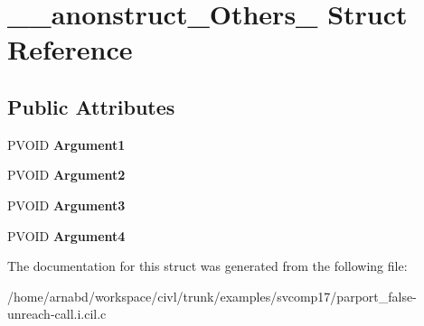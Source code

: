 \hypertarget{struct____anonstruct__Others__84}{}\section{\+\_\+\+\_\+anonstruct\+\_\+\+Others\+\_ Struct Reference}
\label{struct____anonstruct__Others__84}
\subsection*{Public Attributes}
\begin{DoxyCompactItemize}
\item 
\hypertarget{struct____anonstruct__Others__84_ac3c0921b0a8f14cf08a707bc8c01035b}{}P\+V\+O\+I\+D {\bfseries Argument1}\label{struct____anonstruct__Others__84_ac3c0921b0a8f14cf08a707bc8c01035b}

\item 
\hypertarget{struct____anonstruct__Others__84_aa542e1e13ef216b4d579587ccb0557c2}{}P\+V\+O\+I\+D {\bfseries Argument2}\label{struct____anonstruct__Others__84_aa542e1e13ef216b4d579587ccb0557c2}

\item 
\hypertarget{struct____anonstruct__Others__84_a5bb35323a7015cf901478a8cc807a720}{}P\+V\+O\+I\+D {\bfseries Argument3}\label{struct____anonstruct__Others__84_a5bb35323a7015cf901478a8cc807a720}

\item 
\hypertarget{struct____anonstruct__Others__84_ae46b77a792da48406ebb672768471812}{}P\+V\+O\+I\+D {\bfseries Argument4}\label{struct____anonstruct__Others__84_ae46b77a792da48406ebb672768471812}

\end{DoxyCompactItemize}


The documentation for this struct was generated from the following file\+:\begin{DoxyCompactItemize}
\item 
/home/arnabd/workspace/civl/trunk/examples/svcomp17/parport\+\_\+false-\/unreach-\/call.\+i.\+cil.\+c\end{DoxyCompactItemize}
